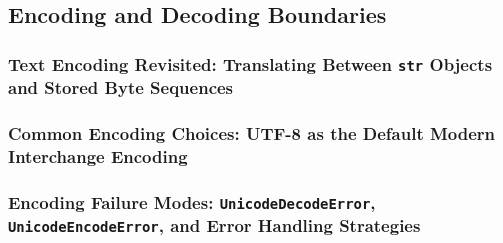\subsection{Encoding and Decoding Boundaries}
\subsubsection{Text Encoding Revisited: Translating Between \texttt{str} Objects and Stored Byte Sequences}
\subsubsection{Common Encoding Choices: UTF-8 as the Default Modern Interchange Encoding}
\subsubsection{Encoding Failure Modes: \texttt{UnicodeDecodeError}, \texttt{UnicodeEncodeError}, and Error Handling Strategies}
